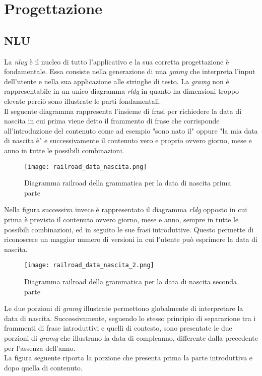 \section{Progettazione}
	\subsection{NLU}
	La \emph{\gls{nlug}} è il nucleo di tutto l'applicativo e la sua corretta progettazione è fondamentale. Essa consiste nella generazione di una \emph{\gls{gramg}} che interpreta l'input dell'utente e nella sua applicazione alle stringhe di testo. La \emph{\gls{gramg}} non è rappresentabile in un unico diagramma \emph{\gls{rldg}} in quanto ha dimensioni troppo elevate perciò sono illustrate le parti fondamentali. \\
	Il seguente diagramma rappresenta l'insieme di frasi per richiedere la data di nascita in cui prima viene detto il frammento di frase che corrisponde all'introduzione del contenuto come ad esempio "sono nato il" oppure "la mia data di nascita è" e successivamente il contenuto vero e proprio ovvero giorno, mese e anno in tutte le possibili combinazioni. 
		
	\begin{figure}[htbp]
		\begin{center}
			\texttt{[image: railroad\_data\_nascita.png]}
			\caption{Diagramma railroad della grammatica per la data di nascita prima parte}
		\end{center}
	\end{figure}
	
	Nella figura successiva invece è rappresentato il diagramma \emph{\gls{rldg}} opposto in cui prima è previsto il contenuto ovvero giorno, mese e anno, sempre in tutte le possibili combinazioni, ed in seguito le sue frasi introduttive. Questo permette di riconoscere un maggior numero di versioni in cui l'utente può esprimere la data di nascita.
	
	\begin{figure}[htbp]
		\begin{center}
			\texttt{[image: railroad\_data\_nascita\_2.png]}
			\caption{Diagramma railroad della grammatica per la data di nascita seconda parte}
		\end{center}
	\end{figure}

	Le due porzioni di \emph{\gls{gramg}} illustrate permettono globalmente di interpretare la data di nascita. Successivamente, seguendo lo stesso principio di separazione tra i frammenti di frase introduttivi e quelli di contesto, sono presentate le due porzioni di \emph{\gls{gramg}} che illustrano la data di compleanno, differente dalla precedente per l'assenza dell'anno. \\
	La figura seguente riporta la porzione che presenta prima la parte introduttiva e dopo quella di contenuto.
	
